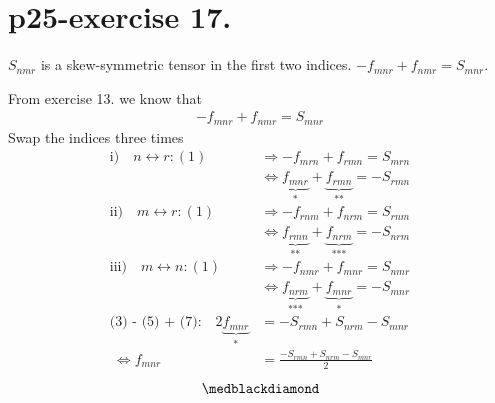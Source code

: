 \section{p25-exercise 17.}
\begin{tcolorbox}
$S_{nmr}$ is a skew-symmetric tensor in the first two indices.
 $-f_{mnr} + f_{nmr} = S_{mnr}$.
\end{tcolorbox}
From exercise 13. we know that 
\begin{align}
-f_{mnr} + f_{nmr} = S_{mnr}
\end{align}
Swap the indices three times
\begin{align}
\text{i)}\quad n \leftrightarrow r: (1) &\Rightarrow -f_{mrn} + f_{rmn } = S_{mrn}\\
\ &\Leftrightarrow \underbrace{f_{mnr}}_\text{*} + \underbrace{f_{rmn }}_\text{**} = -S_{rmn}\\
\text{ii)}\quad m \leftrightarrow r: (1) &\Rightarrow -f_{rnm} + f_{nrm } = S_{rnm}\\
\ &\Leftrightarrow \underbrace{f_{rmn}}_\text{**} + \underbrace{f_{nrm }}_\text{***} = -S_{nrm}\\
\text{iii)}\quad m \leftrightarrow n: (1) &\Rightarrow -f_{nmr} + f_{mnr } = S_{nmr}\\
\ &\Leftrightarrow \underbrace{f_{nrm}}_\text{***} + \underbrace{f_{mnr }}_\text{*} = -S_{mnr}\\
\text{(3) - (5) + (7):} \quad 2\underbrace{f_{mnr}}_\text{*} &= -S_{rmn}+S_{nrm}-S_{mnr}\\
\ \Leftrightarrow f_{mnr} &= \frac{-S_{rmn}+S_{nrm}-S_{mnr}}{2}
\end{align}
$$\medblackdiamond$$
\pagebreak[4]